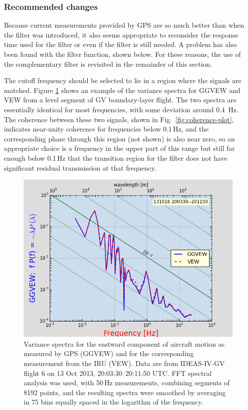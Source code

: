 \documentclass[12pt,twoside,english]{article}\usepackage[]{graphicx}\usepackage[]{color}
\makeatletter
\def\maxwidth{ %
  \ifdim\Gin@nat@width>\linewidth
    \linewidth
  \else
    \Gin@nat@width
  \fi
}
\makeatother
\begin{document}
\subsubsection{Recommended changes}

Because current measurements provided by GPS are so much better than when the filter was introduced, it also seems appropriate to reconsider the response time used for the filter or even if the filter is still needed. A problem has also been found with the filter function, shown below. For these reasons, the use of the complementary filter is revisited in the remainder of this section.

The cutoff frequency should be selected to lie in a region where the signals are matched. Figure \ref{fig:FFTVEW} shows an example of the variance spectra for GGVEW and VEW from a level segment of GV boundary-layer flight. The two spectra
are essentially identical for most frequencies, with some deviation around 0.4~Hz. The coherence between these two signals, shown in Fig.~\ref{fig:coherence-plot}, indicates near-unity coherence for frequencies below 0.1\,Hz, and the corresponding phase through this region (not shown) is also near zero, so an appropriate choice is a frequency in the upper part of this range but still far enough below 0.1\,Hz that the transition region for the filter does not have significant residual transmission at that frequency.

\begin{figure}
\noindent \begin{centering}
\includegraphics[width=\maxwidth]{FFTVEW}
\par\end{centering}
\protect\caption[Variance spectra for the eastward component of aircraft motion as measured by GPS and by IRU.]{Variance spectra for the eastward component of aircraft motion as measured by GPS (GGVEW) and for the corresponding measurement from the IRU (VEW). Data are from IDEAS-IV-GV flight 6 on 13 Oct 2013, 20:03:30--20:11:50 UTC. FFT spectral analysis was used, with 50\,Hz measurements, combining segments of 8192 points, and the resulting spectra were smoothed by averaging in 75 bins equally spaced in the logarithm of the frequency.\label{fig:FFTVEW}} 
\end{figure}
\end{document}
